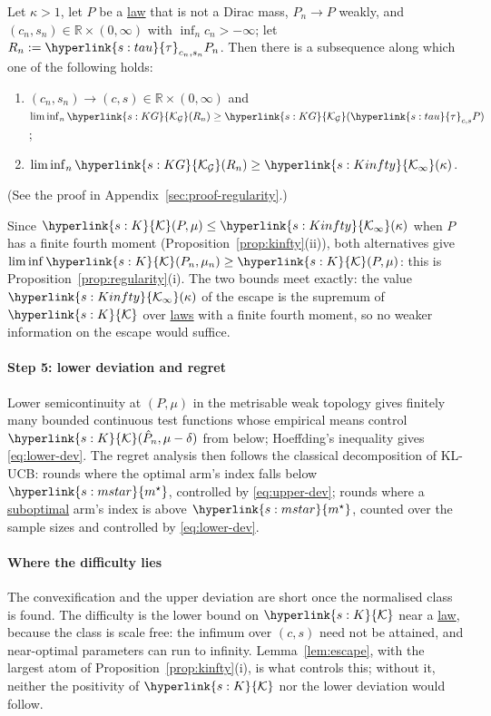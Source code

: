 \documentclass[11pt]{article}
\newcommand{\R}{\mathbb{R}}
\newcommand{\sy}[2]{{\hyperlink{#1}{#2}}}
\newcommand{\term}[2]{\hyperlink{#1}{#2}}
\newcommand{\mstar}{\sy{s:mstar}{m^{\star}}}
\newcommand{\Kc}{\sy{s:K}{\mathcal{K}}}
\newcommand{\KG}{\sy{s:KG}{\mathcal{K}_{\mathcal{G}}}}
\newcommand{\tauc}{\sy{s:tau}{\tau}}
\newcommand{\Kinfty}{\sy{s:Kinfty}{\mathcal{K}_{\infty}}}
\begin{document}
\begin{lemma}\label{lem:escape}
Let $\kappa>1$, let $P$ be a \term{w:law}{law} that is not a Dirac mass, $P_n\to P$ weakly, and
$(c_n,s_n)\in\R\times(0,\infty)$ with $\inf_nc_n>-\infty$; let $R_n:=\tauc_{c_n,s_n}P_n$. Then there is a
subsequence along which one of the following holds:
\begin{enumerate}[label=(\alph*)]
  \item $(c_n,s_n)\to(c,s)\in\R\times(0,\infty)$ and $\liminf_n\KG(R_n)\ge\KG(\tauc_{c,s}P)$;
  \item $\liminf_n\KG(R_n)\ge\Kinfty(\kappa)$.
\end{enumerate}
\end{lemma}

(See the proof in Appendix~\ref{sec:proof-regularity}.)

Since $\Kc(P,\mu)\le\Kinfty(\kappa)$ when $P$ has a finite fourth moment (Proposition~\ref{prop:kinfty}(ii)), both
alternatives give $\liminf\Kc(P_n,\mu_n)\ge\Kc(P,\mu)$: this is Proposition~\ref{prop:regularity}(i). The two
bounds meet exactly: the value $\Kinfty(\kappa)$ of the escape is the supremum of $\Kc$ over \term{w:law}{laws} with a finite fourth
moment, so no weaker
information on the escape would suffice.

\paragraph{Step 5: lower deviation and regret} Lower semicontinuity at $(P,\mu)$ in the metrisable weak
topology gives finitely many bounded continuous test functions whose empirical means control
$\Kc(\hat P_n,\mu-\delta)$ from below; Hoeffding's inequality gives \eqref{eq:lower-dev}. The regret analysis
then follows the classical decomposition of KL-UCB: rounds where the optimal arm's index falls below
$\mstar$, controlled by \eqref{eq:upper-dev}; rounds where a \term{w:subopt}{suboptimal} arm's index is above $\mstar$,
counted over the sample sizes and controlled by \eqref{eq:lower-dev}.

\paragraph{Where the difficulty lies} The convexification and the upper deviation are short once the
normalised class is found. The difficulty is the lower bound on $\Kc$ near a \term{w:law}{law}, because the class is
scale free: the infimum over $(c,s)$ need not be attained, and near-optimal parameters can run to infinity.
Lemma~\ref{lem:escape}, with the largest atom of Proposition~\ref{prop:kinfty}(i), is what controls this; without
it, neither the positivity of $\Kc$ nor the lower deviation would follow.
\end{document}
